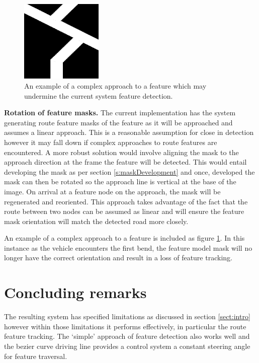 \documentclass[]{aiaa-tc}%
\begin{document}
\begin{figure} %
	\centering
	\includegraphics[width=0.35\textwidth]{complexFeatureApproach.png}
	\caption{An example of a complex approach to a feature which may undermine the current system feature detection.}
	\label{f:complexFeatureApproach}
\end{figure}

\textbf{Rotation of feature masks.} The current implementation has the system generating route feature masks of the feature as it will be approached and assumes a linear approach. This is a reasonable assumption for close in detection however it may fall down if complex approaches to route features are encountered. A more robust solution would involve aligning the mask to the approach direction at the frame the feature will be detected. This would entail developing the mask as per section \ref{s:maskDevelopment} and once, developed the mask can then be rotated so the approach line is vertical at the base of the image. On arrival at a feature node on the approach, the mask will be regenerated and reoriented. This approach takes advantage of the fact that the route between two nodes can be assumed as linear and will ensure the feature mask orientation will match the detected road more closely. 

An example of a complex approach to a feature is included as figure \ref{f:complexFeatureApproach}. In this instance as the vehicle encounters the first bend, the feature model mask will no longer have the correct orientation and result in a loss of feature tracking. 

\section{Concluding remarks}

The resulting system has specified limitations as discussed in section \ref{sect:intro} however within those limitations it performs effectively, in particular the route feature tracking. The `simple' approach of feature detection also works well and the bezier curve driving line provides a control system a constant steering angle for feature traversal.
\end{document}
